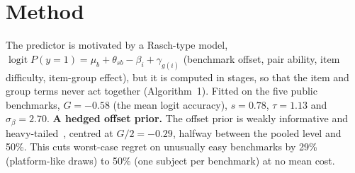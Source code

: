 \documentclass{article}
\begin{document}
\section{Method}\label{sec:method}
The predictor is motivated by a Rasch-type model,
$\operatorname{logit} P(y=1) = \mu_b + \theta_{sb} - \beta_i + \gamma_{g(i)}$ (benchmark offset, pair ability, item
difficulty, item-group effect), but it is computed in stages, so that the item and group terms never act together
(Algorithm~1). Fitted on the five public benchmarks, $G=-0.58$ (the mean logit accuracy), $s=0.78$, $\tau=1.13$ and
$\sigma_\beta=2.70$. \textbf{A hedged offset prior.} The offset prior is weakly informative and
heavy-tailed~\cite{gelman2008}, centred at $G/2=-0.29$, halfway between the pooled level and 50\%. This cuts
worst-case regret on unusually easy benchmarks by 29\% (platform-like draws) to 50\% (one subject per benchmark) at
no mean cost.
\end{document}
